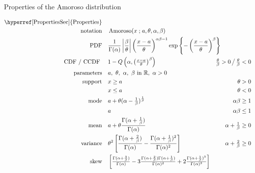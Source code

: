 

\begin{table*}[pt!]

\caption[Amoroso distribution -- Properties]{Properties of the Amoroso distribution}

\begin{align*}
\text{\hyperref[PropertiesSec]{Properties}}  \quad& \\
\text{notation} \quad &  \op{Amoroso}(x\given a, \theta, \alpha, \beta)  \checked
\\
\text{PDF} \quad &
\frac{1}{\Gamma(\alpha)} 
\left|\frac{\beta}{\theta}\right|
\left(\frac{x-a}{\theta}\right)^{\alpha \beta -1}
\exp \left\{
-  \left(\frac{x-a}{\theta}\right)^{\beta}
\right\}
\checked
\hspace{-8em}
\\ 
\text{CDF / CCDF } \quad  &    1-Q\left(\alpha, \left(\tfrac{x - a }{\theta}\right)^{\beta}\right) 
\checked & \tfrac{\theta}{\beta}>0 \, \big/ \,  \tfrac{\theta}{\beta}<0
\\
\text{parameters}\quad &   a,\ \theta,\ \alpha,\ \beta\  \text{in } \Real, \ \alpha>0	\checked
\\
\text{support} \quad &     x \geq a &  \theta > 0 \checked
\\
&   x\leq a  &  \theta < 0 	\checked
\\
\text{mode} \quad&   a+ \theta (\alpha-\tfrac{1}{\beta})^{\frac{1}{\beta}}  \checked
& \alpha \beta  \geq 1		\checked
\\ & a & \alpha \beta  \le 1
\\
\text{mean} \quad& a  + \theta \frac{\Gamma(\alpha+\frac{1}{\beta})}{\Gamma(\alpha)}  \checked
& \alpha + \tfrac{1}{\beta} \geq 0
\\
\text{variance}  \quad&   \theta^2 \left[  \frac{\Gamma(\alpha+\frac{2}{\beta})}{\Gamma(\alpha)}  - 
\frac{\Gamma(\alpha+\frac{1}{\beta})^2}{\Gamma(\alpha)^2}    \right] \checked
& \alpha + \tfrac{2}{\beta} \geq 0
\\
\text{skew} \quad  &  \left[  \tfrac{\Gamma(\alpha+\frac{3}{\beta})}{\Gamma(\alpha)} - 3 \tfrac{\Gamma(\alpha+\frac{2}{\beta})\Gamma(\alpha+\frac{1}{\beta})}{\Gamma(\alpha)^2}    + 2  \tfrac{\Gamma(\alpha+\frac{1}{\beta})^3}{\Gamma(\alpha)^3}   \right]

\end{align*}
\end{table*}
